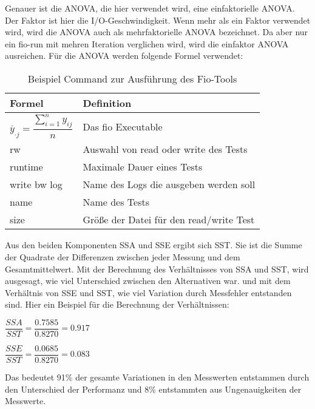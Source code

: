 Genauer ist die ANOVA, die hier verwendet wird, eine einfaktorielle ANOVA.
Der Faktor ist hier die I/O-Geschwindigkeit. Wenn mehr als ein Faktor verwendet wird, wird die ANOVA auch als mehrfaktorielle ANOVA bezeichnet.
Da aber nur ein fio-run mit mehren Iteration verglichen wird, wird die einfaktor ANOVA ausreichen.
Für die ANOVA werden folgende Formel verwendet:

\begin{center}
  \begin{table}[h!]
    \begin{tabularx}{\textwidth}{|X|X|}
      \hline
        Formel & Definition \\ 
      \hline
      $\overline{y}_{\cdot j} = \dfrac{\sum_{i=1}^{n} y_{ij}}{n}$ & Das fio Executable  \\ 
      rw & Auswahl von read oder write des Tests  \\ 
      \hline
      runtime & Maximale Dauer eines Tests  \\ 
      \hline
      write bw log &  Name des Logs die ausgeben werden soll   \\ 
      \hline
      name &  Name des Tests   \\ 
      \hline
      size & Größe der Datei für den read/write Test    \\ 
      \hline
    \end{tabularx}
    \caption{Beispiel Command zur Ausführung des Fio-Tools}
    \label{tab:formel_mittelwerte}
  \end{table}
\end{center}

Aus den beiden Komponenten SSA und SSE ergibt sich SST.
Sie ist die Summe der Quadrate der Differenzen zwischen jeder Messung und dem Gesamtmittelwert.
Mit der Berechnung des Verhältnisses von SSA und SST, wird ausgesagt, wie viel Unterschied zwischen den Alternativen war.
und mit dem Verhältnis von SSE und SST, wie viel Variation durch Messfehler entstanden sind.  
Hier ein Beispiel für die Berechnung der Verhältnissen:

\begin{center}
  $\dfrac{SSA}{SST} = \dfrac{0.7585}{0.8270} = 0.917$
\end{center}

\begin{center}
  $\dfrac{SSE}{SST} = \dfrac{0.0685}{0.8270} = 0.083$
\end{center}

Das bedeutet 91\% der gesamte Variationen in den Messwerten entstammen durch den Unterschied der Performanz und
8\% entstammten aus Ungenauigkeiten der Messwerte. 



